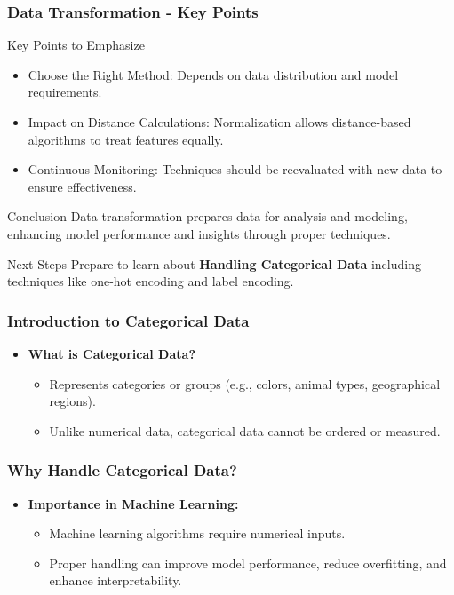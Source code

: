 \documentclass[aspectratio=169]{beamer}
\begin{document}
\begin{frame}[fragile]
    \frametitle{Data Transformation - Key Points}
    \begin{block}{Key Points to Emphasize}
        \begin{itemize}
            \item Choose the Right Method: Depends on data distribution and model requirements.
            \item Impact on Distance Calculations: Normalization allows distance-based algorithms to treat features equally.
            \item Continuous Monitoring: Techniques should be reevaluated with new data to ensure effectiveness.
        \end{itemize}
    \end{block}
    
    \begin{block}{Conclusion}
        Data transformation prepares data for analysis and modeling, enhancing model performance and insights through proper techniques.
    \end{block}
    
    \begin{block}{Next Steps}
        Prepare to learn about \textbf{Handling Categorical Data} including techniques like one-hot encoding and label encoding.
    \end{block}
\end{frame}

\begin{frame}
    \titlepage
\end{frame}

\begin{frame}
    \frametitle{Introduction to Categorical Data}
    \begin{itemize}
        \item \textbf{What is Categorical Data?}
        \begin{itemize}
            \item Represents categories or groups (e.g., colors, animal types, geographical regions).
            \item Unlike numerical data, categorical data cannot be ordered or measured.
        \end{itemize}
    \end{itemize}
\end{frame}

\begin{frame}
    \frametitle{Why Handle Categorical Data?}
    \begin{itemize}
        \item \textbf{Importance in Machine Learning:}
        \begin{itemize}
            \item Machine learning algorithms require numerical inputs.
            \item Proper handling can improve model performance, reduce overfitting, and enhance interpretability.
        \end{itemize}
    \end{itemize}
\end{frame}
\end{document}
